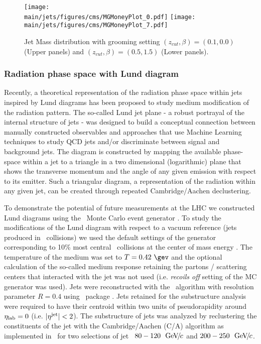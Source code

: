 %
\begin{figure}[!ht]
\begin{center}
\texttt{[image: \\main/jets/figures/cms/MGMoneyPlot\_0.pdf]}
\texttt{[image: \\main/jets/figures/cms/MGMoneyPlot\_7.pdf]}
\caption{Jet Mass distribution with grooming setting $(z_{cut},\beta)=(0.1,0.0)$ (Upper panels) and $(z_{cut},\beta)=(0.5,1.5)$ (Lower panels). \cite{CMS-FTR-17-002:2017dec}}
\label{fig:Mass}
\end{center}
\end{figure}


\newpage
\subsubsection{Radiation phase space with Lund diagram}

Recently, a theoretical representation of the radiation phase space within jets inspired by Lund diagrams \cite{Andersson:1988gp} has been proposed to study medium modification of the radiation pattern. The so-called Lund jet plane \cite{Dreyer:2018nbf} - a robust portrayal of the internal structure of jets - was designed to build a conceptual connection between manually constructed observables and approaches that use Machine Learning techniques to study QCD jets and/or discriminate between signal and background jets.
The diagram is constructed by mapping the available phase-space within a jet to a triangle in a two dimensional (logarithmic) plane that shows the transverse momentum and the angle of any given emission with respect to its emitter.
Such a triangular diagram, a representation of the radiation within any given jet, can be created through repeated Cambridge/Aachen declustering.

To demonstrate the potential of future measurements at the LHC we constructed Lund diagrams using the \jewel\ Monte Carlo event generator \cite{Zapp:2013vla}.
To study the modifications of the Lund diagram with respect to a vacuum reference (jets produced in \pp\ collisions) we used the default settings of the generator corresponding to 10\% most central \PbPb\ collisions at the center of mass energy .
The temperature of the medium was set to $T=0.42~\gev$ and the optional calculation of the so-called medium response retaining the partons / scattering centers that interacted with the jet was not used (i.e. {\it recoils off} setting of the MC generator was used).
Jets were reconstructed with the \akt\ algorithm \cite{Cacciari:2008gp} with resolution parameter $R=0.4$ using \fastjet\ package \cite{Cacciari:2011ma,Cacciari:2005hq}.
Jets retained for the substructure analysis were required to have their centroid within two units of pseudorapidity around $\eta_{\rm lab}=0$ (i.e. $|\eta^{\rm jet}| < 2$).
The substructure of jets was analyzed by reclustering the constituents of the jet with the Cambridge/Aachen (C/A) algorithm as implemented in \fastjet\ for two selections of jet \pt\ $80-120~~\text{GeV}\!/\mspace{-2mu}c$ and $200-250~~\text{GeV}\!/\mspace{-2mu}c$.


